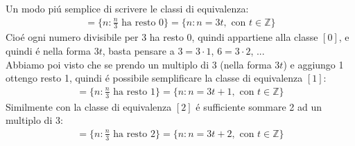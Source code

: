 \documentclass[twoside]{article} %
\begin{document}
	Un modo pi\'u semplice di scrivere le classi di equivalenza:	
	\begin{gather*}
		[0]=\{n: \frac{n}{3} \text{ ha resto }0\}=\{n:n=3t,\text{ con }t\in \mathbb{Z}\}
	\end{gather*}
	Cio\'e ogni numero divisibile per $3$ ha resto 0, quindi appartiene alla classe $[0]$, e quindi \'e nella forma $3t$, basta pensare a $3=3\cdot 1$, $6=3\cdot 2$, ...\\
	Abbiamo poi visto che se prendo un multiplo di 3 (nella forma $3t$) e aggiungo 1 ottengo resto 1, quindi \'e possibile semplificare la classe di equivalenza $[1]$:
	\begin{gather*}
		[1]=\{n: \frac{n}{3} \text{ ha resto }1\}=\{n:n=3t+1,\text{ con }t\in \mathbb{Z}\}
	\end{gather*}	 
	Similmente con la classe di equivalenza $[2]$ \'e sufficiente sommare 2 ad un multiplo di 3:
	\begin{gather*}
		[2]=\{n: \frac{n}{3} \text{ ha resto }2\}=\{n:n=3t+2,\text{ con }t\in \mathbb{Z}\}
	\end{gather*}
	\newpage	
\end{document}
